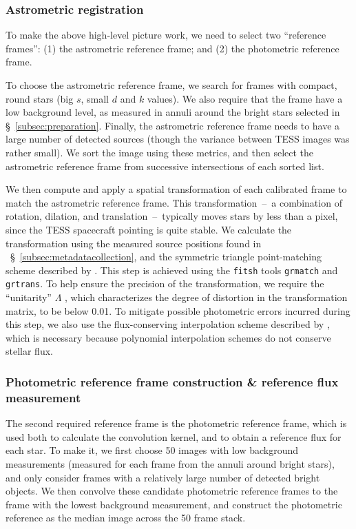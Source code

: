 \documentclass[12pt,twocolumn,tighten]{aastex62}
\begin{document}
\subsubsection{Astrometric registration}

To make the above high-level picture work, we need to select
two ``reference frames'':
(1) the astrometric reference frame; and (2) the photometric reference frame.

To choose the astrometric reference frame, we search for frames with
compact, round stars (big $s$, small $d$ and $k$ values).  We also
require that the frame have a low background level, as measured in
annuli around the bright stars selected in
\S~\ref{subsec:preparation}.  Finally, the astrometric reference
frame needs to have a large
number of detected sources (though the variance between TESS images was rather 
small).  We sort the image
using these metrics, and then select the astrometric reference frame from
successive intersections of each sorted list.

We then compute and apply a spatial transformation of each calibrated
frame to match the astrometric reference frame.  This
transformation~--~a combination of rotation, dilation, and
translation~--~typically moves stars by less than a pixel, since the
TESS spacecraft pointing is quite stable.  We calculate the transformation
using the measured source positions found in
~\S~\ref{subsec:metadatacollection}, and the symmetric triangle
point-matching scheme described by \citet[][~\S~2.5.2]{Pal_2009}.
This step is achieved using the \texttt{fitsh} tools \texttt{grmatch} and
\texttt{grtrans}.  To help ensure the precision of the transformation,
we require the ``unitarity'' $\Lambda$
\citep[][~Eq.~54]{Pal_2009}, which characterizes the degree of
distortion in the transformation matrix, to be below 0.01.  To
mitigate possible photometric errors incurred during this step, we
also use the flux-conserving interpolation scheme described by
\citet{Pal_2009}, which is necessary because polynomial interpolation
schemes do not conserve stellar flux. 

\subsubsection{Photometric reference frame construction \& reference flux measurement}
\label{subsubsec:photref}

The second required reference frame is the photometric reference frame,
which is used both to calculate the convolution kernel, and to obtain
a reference flux for each star.  To make it, we first choose 50 images
with low background measurements (measured for each frame from the
annuli around bright stars), and only consider frames with a
relatively large number of detected bright objects.  We then convolve
these candidate photometric reference frames to the frame with the
lowest background measurement, and construct the photometric
reference as the median image across the 50 frame stack. 
\end{document}
